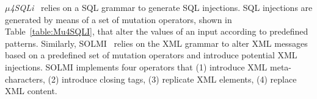 






\emph{$\mu$4SQLi}~\cite{Appelt:SQLI:ISSTA:2014} relies on a SQL grammar to generate SQL injections. 
SQL injections are generated by means of a set of mutation operators, shown in Table~\ref{table:Mu4SQLI}, that alter the values of an input according to predefined patterns.
Similarly, SOLMI~\cite{Jan:ISSTA:2016} relies on the XML grammar to alter XML messages based on a predefined set of mutation operators and introduce potential XML injections. 
SOLMI implements four operators that (1) introduce XML meta-characters, (2) introduce closing tags, (3) replicate XML elements, (4) replace XML content.


